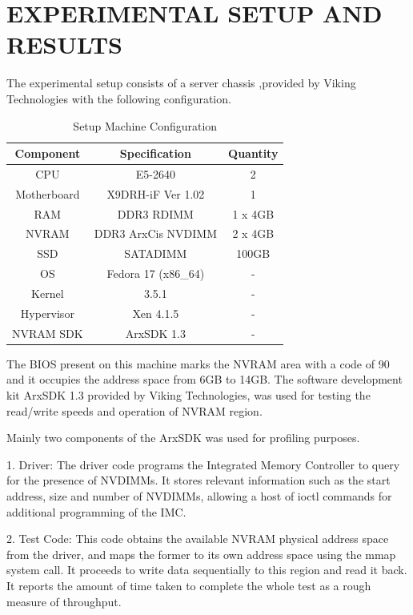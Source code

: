 

\chapter{\uppercase{Experimental Setup and Results}}

The experimental setup consists of a server chassis \cite{arxcis},provided by Viking Technologies with the following configuration. 


\begin{table}[H]
\centering
\caption{Setup Machine Configuration}
\label{tab:unixcomp}
\begin{tabular}{|c|c|c|}
    \hline
    Component & Specification & Quantity \\
    \hline
    \hline
    CPU & E5-2640 & 2                    \\
    \hline
    Motherboard & X9DRH-iF Ver 1.02 & 1  \\
    \hline
    RAM & DDR3 RDIMM & 1 x 4GB           \\
    \hline
    NVRAM & DDR3 ArxCis NVDIMM & 2 x 4GB \\
    \hline
    SSD & SATADIMM & 100GB               \\
    \hline
    OS & Fedora 17 (x86\_64) & -         \\
    \hline
    Kernel & 3.5.1 & -                   \\
    \hline
    Hypervisor & Xen 4.1.5 & -           \\
    \hline
    NVRAM SDK & ArxSDK 1.3 & -           \\
    \hline
\end{tabular}
\end{table}

The BIOS present on this machine marks the NVRAM area with a code of 90 and it occupies the address space from 6GB to 14GB. The software development kit ArxSDK 1.3 provided by Viking Technologies, was used for testing the read/write speeds and operation of NVRAM region.

Mainly two components of the ArxSDK was used for profiling purposes.

1. Driver: The driver code programs the Integrated Memory Controller to query for the presence of NVDIMMs. It stores relevant information such as the start address, size and number of NVDIMMs, allowing a host of ioctl commands for additional programming of the IMC.

2. Test Code: This code obtains the available NVRAM physical address space from the driver, and maps the former to its own address space using the mmap system call. It proceeds to write data sequentially to this region and read it back. It reports the amount of time taken to complete the whole test as a rough measure of throughput.

